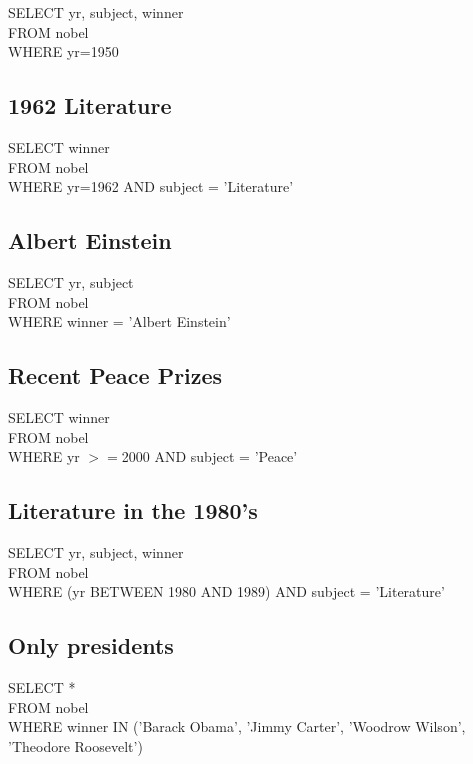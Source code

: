 \documentclass[10pt, oneside]{article}
\begin{document}
SELECT yr, subject, winner \\
FROM nobel \\
WHERE yr=1950 \\

\subsection{1962 Literature}

SELECT winner \\
FROM nobel \\
WHERE yr=1962 AND subject = 'Literature' \\

\subsection{Albert Einstein}

SELECT yr, subject \\
FROM nobel \\
WHERE winner = 'Albert Einstein' \\

\subsection{Recent Peace Prizes}

SELECT winner \\
FROM nobel \\
WHERE yr $>=$2000 AND subject = 'Peace' \\

\subsection{Literature in the 1980's}

SELECT yr, subject, winner\\
FROM nobel\\
WHERE (yr BETWEEN 1980 AND 1989) AND subject = 'Literature'\\

\subsection{Only presidents}

SELECT * \\
FROM nobel\\
WHERE winner IN ('Barack Obama', 'Jimmy Carter', 'Woodrow Wilson', 'Theodore Roosevelt')\\
\end{document}
